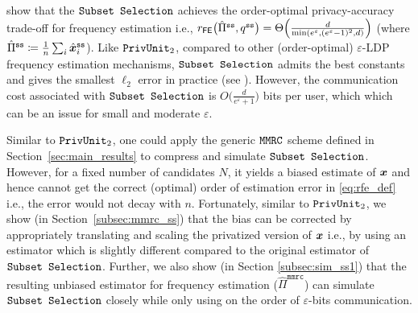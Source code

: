 \cite{YB18} show that the $\texttt{Subset Selection}$ achieves the
order-optimal privacy-accuracy trade-off for frequency estimation i.e., $r_{\mathsf{FE}} \bigl( \hat{\Pi}^\texttt{ss}, q^{\texttt{ss}} \bigr) = \Theta\Bigl(
  \frac{d}{\min( e^\varepsilon, (e^\varepsilon-1)^2, d )}\Bigr)$ (where $\hat{\Pi}^\texttt{ss} \coloneqq \frac{1}{n}\sum_i \hat{{\boldsymbol{x}}}^{\texttt{ss}}_i$). Like $\texttt{PrivUnit}_2$, compared to other (order-optimal) $\varepsilon$-LDP frequency estimation mechanisms, $\texttt{Subset Selection}$ admits the best constants and gives the smallest $\ell_2$ error in practice (see \cite{CKO20}).
However,  the communication cost associated with $\texttt{Subset Selection}$ is $O\bigl(\frac{d}{e^\varepsilon+1}\bigr)$ bits per user, which which can be
an issue for small and moderate $\varepsilon$. 
 
Similar to $\texttt{PrivUnit}_2$, one could apply the generic $\texttt{MMRC}$ scheme defined in Section~\ref{sec:main_results} to compress and simulate $\texttt{Subset Selection}$. However, for a fixed number of candidates $N$, it yields a biased estimate of ${\boldsymbol{x}}$ and hence cannot get the correct (optimal) order of estimation error in \eqref{eq:rfe_def} i.e., the error would not decay with $n$. Fortunately, similar to $\texttt{PrivUnit}_2$, we show (in Section~\ref{subsec:mmrc_ss}) that the bias can be corrected by appropriately translating and scaling the privatized version of ${\boldsymbol{x}}$ i.e., by using an estimator which is slightly different compared to the original estimator of $\texttt{Subset Selection}$.
Further, we also show (in Section \ref{subsec:sim_ss1}) that the resulting unbiased estimator for frequency estimation ($\hat{\Pi}^{\texttt{mmrc}}$) can simulate $\texttt{Subset Selection}$ closely while only using on the order of $\varepsilon$-bits communication.  

